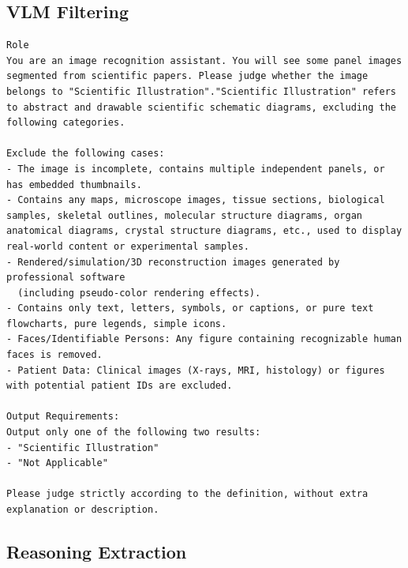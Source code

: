 \documentclass[runningheads]{llncs}
\begin{document}
\subsection{VLM Filtering}
\begin{tcolorbox}[colback=white, colframe=blue!50!black, boxrule=1pt, arc=2mm, breakable]
\scriptsize
\begin{lstlisting}[breaklines=true, breakindent=0pt, basicstyle=\scriptsize\ttfamily, columns=fullflexible]
Role
You are an image recognition assistant. You will see some panel images segmented from scientific papers. Please judge whether the image belongs to "Scientific Illustration"."Scientific Illustration" refers to abstract and drawable scientific schematic diagrams, excluding the following categories.

Exclude the following cases:
- The image is incomplete, contains multiple independent panels, or has embedded thumbnails.
- Contains any maps, microscope images, tissue sections, biological samples, skeletal outlines, molecular structure diagrams, organ anatomical diagrams, crystal structure diagrams, etc., used to display real-world content or experimental samples.
- Rendered/simulation/3D reconstruction images generated by professional software  
  (including pseudo-color rendering effects).
- Contains only text, letters, symbols, or captions, or pure text flowcharts, pure legends, simple icons.
- Faces/Identifiable Persons: Any figure containing recognizable human faces is removed.
- Patient Data: Clinical images (X-rays, MRI, histology) or figures with potential patient IDs are excluded.

Output Requirements:
Output only one of the following two results:
- "Scientific Illustration"
- "Not Applicable"

Please judge strictly according to the definition, without extra explanation or description.
\end{lstlisting}
\end{tcolorbox}

\subsection{Reasoning Extraction}
\end{document}
